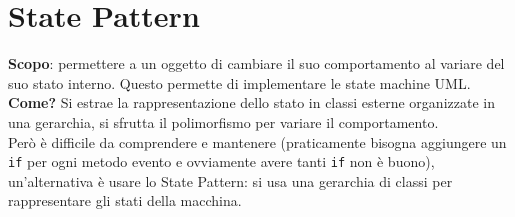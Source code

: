 \documentclass[12pt, a4paper]{report}
\begin{document}
\section{State Pattern}
\textbf{Scopo}: permettere a un oggetto di cambiare il suo comportamento al variare del suo stato interno. Questo permette di implementare le state machine UML.\\
\textbf{Come?} Si estrae la rappresentazione dello stato in classi esterne organizzate in una gerarchia, si sfrutta il polimorfismo per variare il comportamento.\\
Però è difficile da comprendere e mantenere (praticamente bisogna aggiungere un \texttt{if} per ogni metodo evento e ovviamente avere tanti \texttt{if} non è buono), un'alternativa è usare lo State Pattern: si usa una gerarchia di classi per rappresentare gli stati della macchina.
\end{document}

